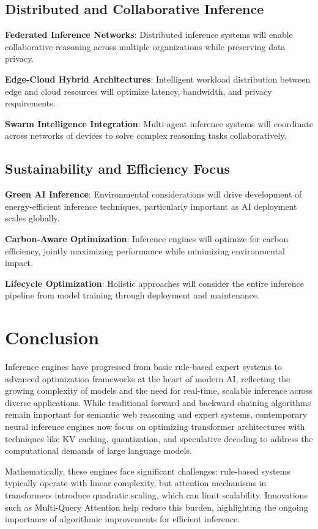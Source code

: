 \documentclass[12pt,a4paper]{article}
\begin{document}
\subsection{Distributed and Collaborative Inference}
\textbf{Federated Inference Networks}: Distributed inference systems will enable collaborative reasoning across multiple organizations while preserving data privacy.

\textbf{Edge-Cloud Hybrid Architectures}: Intelligent workload distribution between edge and cloud resources will optimize latency, bandwidth, and privacy requirements.

\textbf{Swarm Intelligence Integration}: Multi-agent inference systems will coordinate across networks of devices to solve complex reasoning tasks collaboratively.

\subsection{Sustainability and Efficiency Focus}
\textbf{Green AI Inference}: Environmental considerations will drive development of energy-efficient inference techniques, particularly important as AI deployment scales globally.

\textbf{Carbon-Aware Optimization}: Inference engines will optimize for carbon efficiency, jointly maximizing performance while minimizing environmental impact.

\textbf{Lifecycle Optimization}: Holistic approaches will consider the entire inference pipeline from model training through deployment and maintenance.

\section{Conclusion}
Inference engines have progressed from basic rule-based expert systems to advanced optimization frameworks at the heart of modern AI, reflecting the growing complexity of models and the need for real-time, scalable inference across diverse applications. While traditional forward and backward chaining algorithms remain important for semantic web reasoning and expert systems, contemporary neural inference engines now focus on optimizing transformer architectures with techniques like KV caching, quantization, and speculative decoding to address the computational demands of large language models.

Mathematically, these engines face significant challenges: rule-based systems typically operate with linear complexity, but attention mechanisms in transformers introduce quadratic scaling, which can limit scalability. Innovations such as Multi-Query Attention help reduce this burden, highlighting the ongoing importance of algorithmic improvements for efficient inference.
\end{document}
